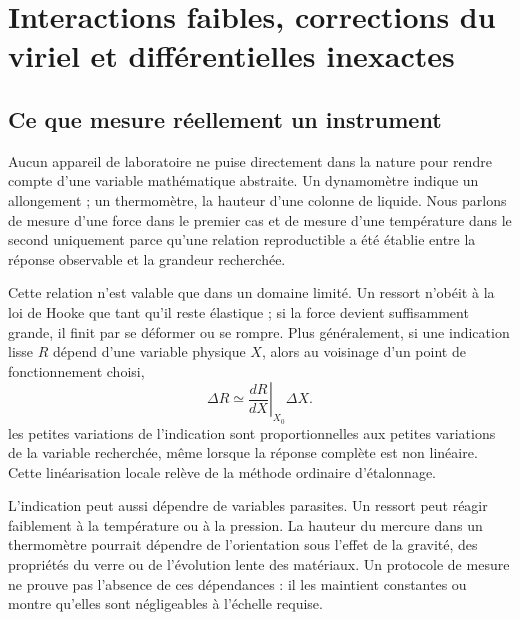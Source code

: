 \chapter{Interactions faibles, corrections du viriel et différentielles inexactes}


\section{Ce que mesure réellement un instrument}

Aucun appareil de laboratoire ne puise directement dans la nature pour rendre compte d’une variable mathématique abstraite. Un dynamomètre indique un allongement ; un thermomètre, la hauteur d’une colonne de liquide. Nous parlons de mesure d’une force dans le premier cas et de mesure d’une température dans le second uniquement parce qu’une relation reproductible a été établie entre la réponse observable et la grandeur recherchée.

Cette relation n’est valable que dans un domaine limité. Un ressort n’obéit à la loi de Hooke que tant qu’il reste élastique ; si la force devient suffisamment grande, il finit par se déformer ou se rompre. Plus généralement, si une indication lisse \(R\) dépend d’une variable physique \(X\), alors au voisinage d’un point de fonctionnement choisi,
\begin{equation}
 \Delta R \simeq
 \left.\frac{dR}{dX}\right|_{X_0}\Delta X.
 \label{eq:sm6-local-linear-response}
\end{equation}
les petites variations de l’indication sont proportionnelles aux petites variations de la variable recherchée, même lorsque la réponse complète est non linéaire. Cette linéarisation locale relève de la méthode ordinaire d’étalonnage.

L’indication peut aussi dépendre de variables parasites. Un ressort peut réagir faiblement à la température ou à la pression. La hauteur du mercure dans un thermomètre pourrait dépendre de l’orientation sous l’effet de la gravité, des propriétés du verre ou de l’évolution lente des matériaux. Un protocole de mesure ne prouve pas l’absence de ces dépendances : il les maintient constantes ou montre qu’elles sont négligeables à l’échelle requise.

